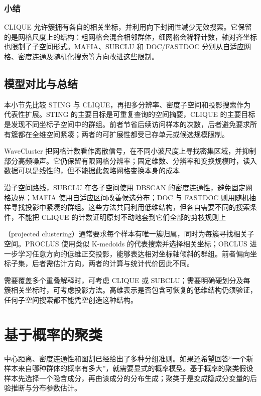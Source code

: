 \subsubsection{小结}

CLIQUE 允许簇拥有各自的相关坐标，并利用向下封闭性减少无效搜索。它保留的是网格尺度上的结构：粗网格会混合相邻群体，细网格会稀释计数，轴对齐坐标也限制了子空间形式。MAFIA、SUBCLU 和 DOC/FASTDOC 分别从自适应网格、密度连通及随机化搜索等方向改进这些限制。

\subsection{模型对比与总结}

本小节先比较 STING 与 CLIQUE，再把多分辨率、密度子空间和投影搜索作为代表性扩展。STING 的主要目标是可重复查询的空间摘要，CLIQUE 的主要目标是发现不同坐标子空间中的群组。前者节省后续访问样本的次数，后者避免要求所有簇都在全维空间紧凑；两者的可扩展性都受已存单元或候选规模限制。

WaveCluster 把网格计数看作离散信号，在不同小波尺度上寻找密集区域，并抑制部分高频噪声。它仍保留有限网格分辨率；固定维数、分辨率和变换规模时，读入数据可以是线性的，但不能据此忽略网格变换本身的成本

沿子空间路线，SUBCLU 在各子空间使用 DBSCAN 的密度连通性，避免固定网格边界；MAFIA 使用自适应区间改善候选分布；DOC 与 FASTDOC 则用随机抽样寻找投影中紧凑的群组。这些方法共同利用低维结构，但各自需要不同的搜索条件，不能把 CLIQUE 的计数证明原封不动地套到它们全部的剪枝规则上

（projected clustering）通常要求每个样本有唯一簇归属，同时为每簇寻找相关子空间。PROCLUS 使用类似 K-medoids 的代表搜索并选择相关坐标；ORCLUS 进一步学习任意方向的低维正交投影，能够表达相对坐标轴倾斜的群组。前者偏向坐标子集，后者需估计方向，两者的计算与统计代价因此不同。

需要覆盖多个重叠解释时，可考虑 CLIQUE 或 SUBCLU；需要明确硬划分及每簇相关坐标时，可考虑投影方法。高维表示是否包含可恢复的低维结构仍须验证，任何子空间搜索都不能凭空创造这种结构。

\section{基于概率的聚类}
\label{sec:clustering-probabilistic}

中心距离、密度连通性和图割已经给出了多种分组准则。如果还希望回答“一个新样本来自哪种群体的概率有多大”，就需要显式的概率模型。基于概率的聚类假设样本先选择一个隐含成分，再由该成分的分布生成；聚类于是变成隐成分变量的后验推断与分布参数估计。

